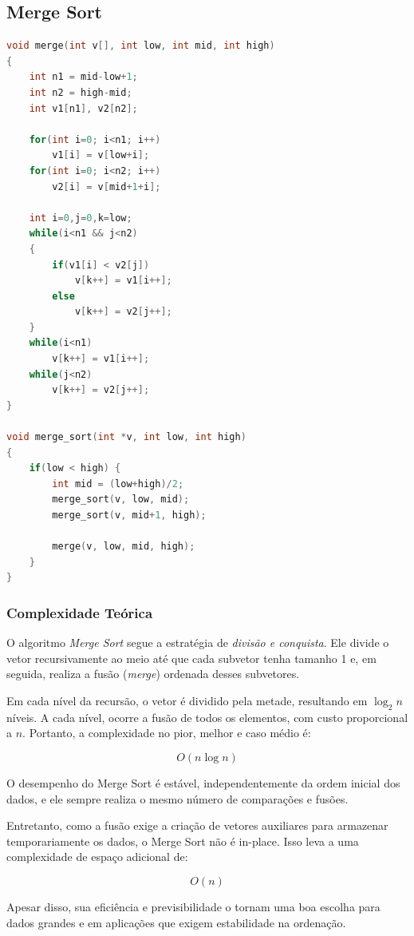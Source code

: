 \subsection{Merge Sort}
\begin{lstlisting}[language=C, caption={Implementação do Merge Sort}, label={lst:merge}]
void merge(int v[], int low, int mid, int high)
{
    int n1 = mid-low+1;
    int n2 = high-mid;
    int v1[n1], v2[n2];

    for(int i=0; i<n1; i++)
        v1[i] = v[low+i];
    for(int i=0; i<n2; i++)
        v2[i] = v[mid+1+i];

    int i=0,j=0,k=low;
    while(i<n1 && j<n2)
    {
        if(v1[i] < v2[j])
            v[k++] = v1[i++];
        else
            v[k++] = v2[j++];
    }
    while(i<n1)
        v[k++] = v1[i++];
    while(j<n2)
        v[k++] = v2[j++];
}

void merge_sort(int *v, int low, int high)
{
    if(low < high) {
        int mid = (low+high)/2;
        merge_sort(v, low, mid);
        merge_sort(v, mid+1, high);

        merge(v, low, mid, high);
    }
}
\end{lstlisting}

\subsubsection{Complexidade Teórica}

O algoritmo \textit{Merge Sort} segue a estratégia de \textit{divisão e conquista}. Ele divide o vetor recursivamente ao meio até que cada subvetor tenha tamanho 1 e, em seguida, realiza a fusão (\textit{merge}) ordenada desses subvetores.

Em cada nível da recursão, o vetor é dividido pela metade, resultando em \(\log_2 n\) níveis. A cada nível, ocorre a fusão de todos os elementos, com custo proporcional a \(n\). Portanto, a complexidade no pior, melhor e caso médio é:

\[
O(n \log n)
\]

O desempenho do Merge Sort é estável, independentemente da ordem inicial dos dados, e ele sempre realiza o mesmo número de comparações e fusões.

Entretanto, como a fusão exige a criação de vetores auxiliares para armazenar temporariamente os dados, o Merge Sort não é in-place. Isso leva a uma complexidade de espaço adicional de:

\[
O(n)
\]

Apesar disso, sua eficiência e previsibilidade o tornam uma boa escolha para dados grandes e em aplicações que exigem
estabilidade na ordenação.~\cite{geeksforgeeks_merge_sort}

